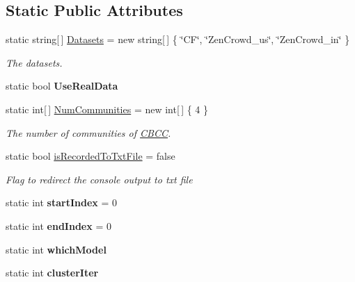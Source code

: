 \subsection*{Static Public Attributes}
\begin{DoxyCompactItemize}
\item 
static string\mbox{[}$\,$\mbox{]} \hyperlink{class_crowdsourcing_models_1_1_program_a4055096a1a87c6ef001b0ebe0a1cc467}{Datasets} = new string\mbox{[}$\,$\mbox{]} \{ \char`\"{}C\+F\char`\"{}, \char`\"{}Zen\+Crowd\+\_\+us\char`\"{}, \char`\"{}Zen\+Crowd\+\_\+in\char`\"{} \}
\begin{DoxyCompactList}\small\item\em The datasets. \end{DoxyCompactList}\item 
\hypertarget{class_crowdsourcing_models_1_1_program_a47f427b18fe8fe4abf17cb01576b7b14}{}static bool {\bfseries Use\+Real\+Data}\label{class_crowdsourcing_models_1_1_program_a47f427b18fe8fe4abf17cb01576b7b14}

\item 
static int\mbox{[}$\,$\mbox{]} \hyperlink{class_crowdsourcing_models_1_1_program_aaf063cf9af3dc47e84aaab11562a5b12}{Num\+Communities} = new int\mbox{[}$\,$\mbox{]} \{ 4 \}
\begin{DoxyCompactList}\small\item\em The number of communities of \hyperlink{class_crowdsourcing_models_1_1_c_b_c_c}{C\+B\+C\+C}. \end{DoxyCompactList}\item 
static bool \hyperlink{class_crowdsourcing_models_1_1_program_a77ef65213ec54609ff34903232672a3d}{is\+Recorded\+To\+Txt\+File} = false
\begin{DoxyCompactList}\small\item\em Flag to redirect the console output to txt file \end{DoxyCompactList}\item 
\hypertarget{class_crowdsourcing_models_1_1_program_a94c9761dbe8926f9f0f7658a16291b6d}{}static int {\bfseries start\+Index} = 0\label{class_crowdsourcing_models_1_1_program_a94c9761dbe8926f9f0f7658a16291b6d}

\item 
\hypertarget{class_crowdsourcing_models_1_1_program_afd9a093c86071eaa4ba6f342c894a6af}{}static int {\bfseries end\+Index} = 0\label{class_crowdsourcing_models_1_1_program_afd9a093c86071eaa4ba6f342c894a6af}

\item 
\hypertarget{class_crowdsourcing_models_1_1_program_a07e68b7cfe03887103512b56e795b4da}{}static int {\bfseries which\+Model}\label{class_crowdsourcing_models_1_1_program_a07e68b7cfe03887103512b56e795b4da}

\item 
\hypertarget{class_crowdsourcing_models_1_1_program_a98ba4d910dfe8dfa76c981f7c0bc26f2}{}static int {\bfseries cluster\+Iter}\label{class_crowdsourcing_models_1_1_program_a98ba4d910dfe8dfa76c981f7c0bc26f2}

\end{DoxyCompactItemize}


